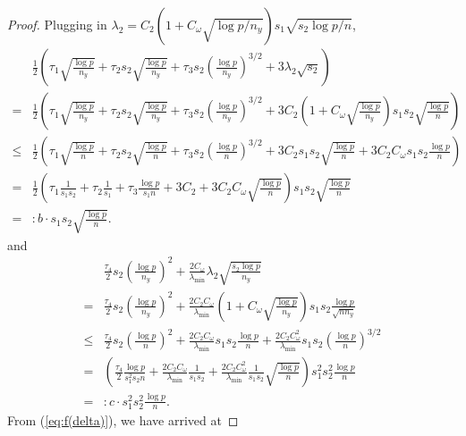 \documentclass[11pt]{article}
\numberwithin{equation}{section}
\numberwithin{theorem}{section}
\theoremstyle{definition}
\theoremstyle{remark}
\begin{document}
\begin{proof}
Plugging in $\lambda_2 = C_2 ( 1+C_\omega \sqrt{\log p / n_y} ) s_1 \sqrt{s_2 \log p / n}$,
\begin{equation}
\begin{aligned}
& \frac{1}{2} \left( \tau_1 \sqrt{\frac{\log p}{n_y}} + \tau_2 s_2 \sqrt{\frac{\log p}{n_y}} + \tau_3 s_2 \left( \frac{\log p}{n_y} \right)^{3/2} + 3\lambda_2 \sqrt{s_2} \right) \\
= & \frac{1}{2} \left( \tau_1 \sqrt{\frac{\log p}{n_y}} + \tau_2 s_2 \sqrt{\frac{\log p}{n_y}} + \tau_3 s_2 \left( \frac{\log p}{n_y} \right)^{3/2} + 3 C_2 \left( 1+C_\omega \sqrt{\frac{\log p}{n_y}} \right) s_1 s_2 \sqrt{\frac{\log p}{n}} \right) \\
\leq & \frac{1}{2} \left( \tau_1 \sqrt{\frac{\log p}{n}} + \tau_2 s_2 \sqrt{\frac{\log p}{n}} + \tau_3 s_2 \left( \frac{\log p}{n} \right)^{3/2} + 3 C_2 s_1 s_2 \sqrt{\frac{\log p}{n}} + 3 C_2 C_\omega s_1 s_2 \frac{\log p}{n} \right) \\
= & \frac{1}{2} \left( \tau_1 \frac{1}{s_1s_2} + \tau_2 \frac{1}{s_1} + \tau_3 \frac{\log p}{s_1 n} + 3 C_2 + 3 C_2 C_\omega \sqrt{\frac{\log p}{n}} \right) s_1 s_2 \sqrt{\frac{\log p}{n}} \\
= & : b \cdot s_1 s_2 \sqrt{\frac{\log p}{n}}.
\end{aligned}
\end{equation}
and
\begin{equation}
\begin{aligned}
& \frac{\tau_4}{2} s_2 \left( \frac{\log p}{n_y} \right)^2 + \frac{2C_\omega}{\lambda_{\min}} \lambda_2 \sqrt{\frac{s_2 \log p}{n_y}} \\
= & \frac{\tau_4}{2} s_2 \left( \frac{\log p}{n_y} \right)^2 + \frac{2C_2 C_\omega}{\lambda_{\min}} \left( 1+C_\omega \sqrt{\frac{\log p}{n_y}} \right) s_1 s_2 \frac{\log p}{\sqrt{nn_y}} \\
\leq & \frac{\tau_4}{2} s_2 \left( \frac{\log p}{n} \right)^2 + \frac{2C_2 C_\omega}{\lambda_{\min}} s_1 s_2 \frac{\log p}{n} + \frac{2C_2 C_\omega^2}{\lambda_{\min}} s_1 s_2 \left( \frac{\log p}{n} \right)^{3/2} \\
= & \left( \frac{\tau_4}{2} \frac{\log p}{s_1^2 s_2 n} + \frac{2C_2 C_\omega}{\lambda_{\min}} \frac{1}{s_1 s_2} + \frac{2C_2 C_\omega^2}{\lambda_{\min}} \frac{1}{s_1s_2} \sqrt{\frac{\log p}{n}} \right) s_1^2 s_2^2 \frac{\log p}{n} \\
= & : c \cdot s_1^2 s_2^2 \frac{\log p}{n}.
\end{aligned}
\end{equation}
From (\ref{eq:f(delta)}), we have arrived at

\end{proof}
\end{document}
